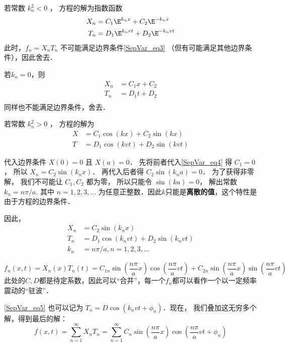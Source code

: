 若常数 $k_n^2 < 0$ ， 方程的解为指数函数
\begin{align}
X_n &= C_1 \E^{k_nx} + C_2 \E^{-k_nx}\\
T_n &= D_1 \E^{k_nvt} + D_2 \E^{-k_nvt}
\end{align}
此时，$f_n = X_nT_n$ 不可能满足边界条件\autoref{SepVar_eq3}  （但有可能满足其他边界条件），因此舍去．

若$k_n=0$，则
\begin{align}
X_n &= C_1x+C_2\\
T_n &= D_1t+D_2\\
\end{align}
同样也不能满足边界条件，舍去．

若常数 $k_n^2 > 0$ ， 方程的解为
\begin{align}\label{SepVar_eq4}
X &= C_1 \cos(kx) + C_2 \sin(kx)\\
T &= D_1 \cos(kvt) + D_2 \sin(kvt)
\end{align}

代入边界条件 $X(0) = 0$ 且 $X(a) = 0$． 先将前者代入\autoref{SepVar_eq4} 得 $C_1 = 0$， 所以 $X_n = C_2\sin(k_nx)$． 再代入后者得 $C_2\sin(k_na) = 0$． 为了获得非零解， 我们不可能让 $C_1, C_2$ 都为零， 所以只能令 $\sin(ka) = 0$， 解出常数 $k_n = n\pi/a$. 其中 $n=1,2,3,...$ 为任意正整数．因此$k$只能是\textbf{离散的值}，这个特性是由于方程的边界条件．

因此，
\begin{align}
\label{SepVar_eq5}X_n &= C_2 \sin(k_nx)\\
T_n &= D_1 \cos(k_nvt) + D_2 \sin(k_nvt)\\
k_n & = n\pi/a, n=1,2,3,...
\end{align}

\begin{equation}
f_n(x, t) = X_n(x) T_n(t) = C_{1n} \sin(\frac{n\pi}{a}x)\cos(\frac{n\pi}{a} vt) + C_{2n}\sin(\frac{n\pi}{a}x)\sin(\frac{n\pi}{a}vt)
\end{equation}
此处的$C, D$都是待定系数，因此可以“合并”，每一个$f_n$都可以看作一个以一定频率震动的“驻波”．

\autoref{SepVar_eq5} 也可以记为 $T_n=D\cos(k_nvt+\phi_n)$．现在， 我们叠加这无穷多个解，得到最后的解：
\begin{equation}
f(x, t) = \sum_{n=1}^\infty X_nT_n = \sum_{n=1}^\infty C_n\sin(\frac{n\pi}{a}x)\cos(\frac{n\pi}{a}vt + \phi_n)
\end{equation}
